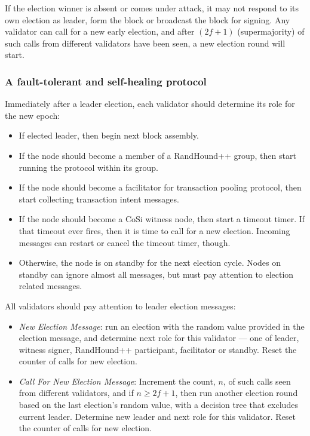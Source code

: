 \documentclass[a4paper, 10pt, conference]{ieeeconf}
\begin{document}
If the election winner is absent or comes under attack, it may not respond to its own election as leader, form the block or broadcast the block for signing. Any validator can call for a new early election, and after $(2 f+1)$ (supermajority) of such calls from different validators have been seen, a new election round will start.

\subsubsection{A fault-tolerant and self-healing protocol} Immediately after a leader election, each validator should determine its role for the new epoch:

\begin{itemize}
	\item If elected leader, then begin next block assembly. 
	\item If the node should become a member of a RandHound++ group, then start running the protocol within its group.
	\item If the node should become a facilitator for transaction pooling protocol, then start collecting transaction intent messages.
	\item If the node should become a CoSi witness node, then start a timeout timer. If that timeout ever fires, then it is time to call for a new election. Incoming messages can restart or cancel the timeout timer, though.
	\item Otherwise, the node is on standby for the next election cycle. Nodes on standby can ignore almost all messages, but must pay attention to election related messages.
\end{itemize}  

All validators should pay attention to leader election messages:

\begin{itemize}
	\item{\textit{New Election Message}: run an election with the random value provided in the election message, and determine next role for this validator --- one of leader, witness signer, RandHound++ participant, facilitator or standby. Reset the counter of calls for new election.}
	\item{\textit{Call For New Election Message}: Increment the count, $n$, of such calls seen from different validators, and if $n \ge 2 f +1$, then run another election round based on the last election's random value, with a decision tree that excludes current leader. Determine new leader and next role for this validator. Reset the counter of calls for new election.}
\end{itemize}
\end{document}
